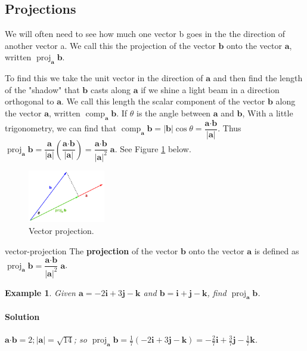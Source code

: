 \documentclass[letterpaper, 11pt, openany]{book}
\newcommand{\scdot}{\boldsymbol{\cdot}}
\newcommand{\proj}[2]{\operatorname{proj}_{\mathbf{#2}}\mathbf{#1}}
\newcommand{\comp}[2]{\operatorname{comp}_{\mathbf{#2}}\mathbf{#1}}
\theoremstyle{mytheoremstyle}
\theoremstyle{myexamplestyle}
\newtheorem{example}{Example}[section]
\newenvironment{solution}{\paragraph{\sffamily \smaller \fontseries{b}\selectfont Solution}}{\hfill\faSquare}
\begin{document}
\subsection{Projections}

We will often need to see how much one vector b goes in the the direction of another vector a. We call this the projection of the vector \(\mathbf{b}\) onto the vector \(\mathbf{a}\), written \(\proj{b}{a}\).

To find this we take the unit vector in the direction of \(\mathbf{a}\) and then find the length of the "shadow" that \(\mathbf{b}\) casts along \(\mathbf{a}\) if we shine a light beam in a direction orthogonal to \(\mathbf{a}\). We call this length the scalar component of the vector \(\mathbf{b}\) along the vector \(\mathbf{a}\), written \(\comp{b}{a}\). If \(\theta\) is the angle between \(\mathbf{a}\) and \(\mathbf{b}\), With a little trigonometry, we can find that \(\comp{b}{a} = |\mathbf{b}| \cos \theta = \dfrac{\mathbf{a} \scdot \mathbf{b}}{|\mathbf{a}|}\). Thus \(\proj{b}{a} = \dfrac{\mathbf{a}}{|\mathbf{a}|}\left( \dfrac{\mathbf{a} \scdot \mathbf{b}}{|\mathbf{a}|} \right)= \dfrac{\mathbf{a} \scdot \mathbf{b}}{|\mathbf{a}|^{2}} \; \mathbf{a}\). See Figure \ref{f:vec-proj} below.

\begin{figure}[htbp]
    \centering
        \includegraphics[width=0.3\textwidth]{Figures/vect-proj.pdf}
    \caption{Vector projection.}
    \label{f:vec-proj}
\end{figure}

\begin{definition}{}{vector-projection}
    The \textbf{projection} of the vector \(\mathbf{b}\) onto the vector \(\mathbf{a}\) is defined as \(\proj{b}{a} = \dfrac{\mathbf{a} \scdot \mathbf{b}}{|\mathbf{a}|^{2}} \; \mathbf{a}\).
\end{definition}

\begin{example}
    Given \(\mathbf{a} = -2 \mathbf{i} + 3 \mathbf{j }- \mathbf{k}\) and \( \mathbf{b} =  \mathbf{i} + \mathbf{j} - \mathbf{k}\), find \(\proj{b}{a}\).
    \begin{solution}
        \(\mathbf{a} \scdot \mathbf{b} = 2; |\mathbf{a}| = \sqrt{14}\); so \(\proj{b}{a} = \frac{1}{7}\left(-2 \mathbf{i} + 3 \mathbf{j }- \mathbf{k}\right) = -\frac{2}{7}\mathbf{i} + \frac{3}{7}\mathbf{j} - \frac{1}{7}\mathbf{k}\).
    \end{solution}
\end{example}
\end{document}
